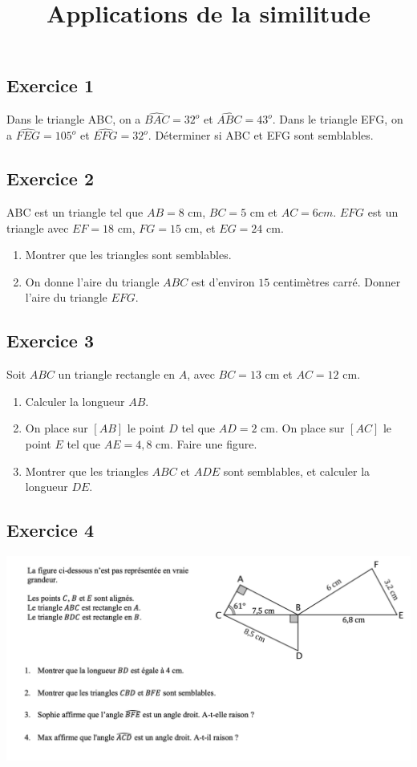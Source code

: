 \documentclass[12 pt]{extarticle}
\title{Applications de la similitude}
\date{}
\theoremstyle{plain}
\begin{document}
 \subsection*{Exercice 1 }
 Dans le triangle ABC, on a $\widehat{BAC}=32^o$ et $\widehat{ABC}= 43^o$. Dans le triangle EFG, on a $\widehat{FEG} = 105^o$ et $\widehat{EFG}= 32^o$. Déterminer si ABC et EFG sont semblables.
 
 
 \subsection*{Exercice 2 }

ABC est un triangle tel que $AB = 8$ cm, $BC = 5$ cm et $AC = 6 cm$. $EFG$ est un triangle avec $EF = 18$ cm, $FG = 15$ cm, et $EG = 24$ cm. \begin{enumerate}
\item 
 Montrer que les triangles sont semblables.
 \item On donne l'aire du triangle $ABC$ est d'environ $15$ centimètres carré. Donner l'aire du triangle $EFG$. 
\end{enumerate}
 \subsection*{Exercice 3}
 
 Soit $ABC$ un triangle rectangle en $A$, avec $BC = 13$ cm et $AC = 12$ cm. 
 \begin{enumerate}
 \item Calculer la longueur $AB$. 
 \item On place sur $[AB]$ le point $D$ tel que $AD= 2$ cm. On place sur $[AC]$ le point $E$ tel que $AE= 4,8$ cm. Faire une figure. 
 \item Montrer que les triangles $ABC$ et $ADE$ sont semblables, et calculer la longueur $DE$.
\end{enumerate}  

 \subsection*{Exercice 4}
 \includegraphics[width = 18 cm]{Exo3}


 
 
 	
\end{document}
